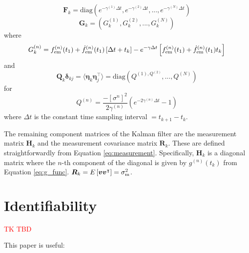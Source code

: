\documentclass[fleqn,usenatbib,useAMS]{mnras}
\begin{document}
\begin{equation}
	\boldsymbol{F}_k = 	\text{diag}\left(e^{- \gamma^{(1)} \Delta t},e^{- \gamma^{(2)} \Delta t},...,e^{- \gamma^{(N)} \Delta t} \right)
\end{equation}
\begin{equation}
\boldsymbol{G}_k	= \left(G^{(1)}_k, G^{(2)}_k,...,G^{(N)}_k \right)
\end{equation}
where
\begin{equation}
	G_k^{(n)} =    f^{(n)}_{\rm em}(t_1) + \dot{f}^{(n)}_{\rm em}(t_1)  \left[\Delta t + t_k \right] - e^{-\gamma \Delta t} \left[  f^{(n)}_{\rm em}(t_1) +\dot{f}^{(n)}_{\rm em}(t_1)  t_k \right]
\end{equation}
and
\begin{equation}
	\boldsymbol{Q}_k \boldsymbol{\delta}_{kj}= \langle \boldsymbol{\eta}_k \boldsymbol{\eta}_j^\intercal \rangle = \text{diag} \left(Q^{(1), Q^{(2)}},...,Q^{(N)}\right) 
\end{equation}
for 
\begin{equation}
	Q^{(n)} = \frac{- [\sigma^{n}]^2}{2 \gamma^{(n)}} \left( e^{-2 \gamma^{(n)} \Delta t} -1\right)
\end{equation}
where $\Delta t$ is the constant time sampling interval $=t_{k+1} -t_{k}$. \newline 


The remaining component matrices of the Kalman filter are the measurement matrix $\boldsymbol{H}_k$ and the measurement covariance matrix $\boldsymbol{R}_k$. These are defined straightforwardly from Equation \ref{eq:measurement}. Specifically, 
$\boldsymbol{H}_k$ is a diagonal matrix where the $n$-th component of the diagonal is given by $g^{(n)}(t_k)$ from Equation \ref{eq:g_func}. $\boldsymbol{R}_k = E \left[ \boldsymbol{v} \boldsymbol{v}^\intercal \right] = \sigma^2_{\rm m}$.













\section{Identifiability}\label{appendix_identifiability}


\textcolor{red}{TK TBD}



This paper is useful: \citep{KARLSSON2012941} \citep{SEDOGLAVIC2002735}
\end{document}
